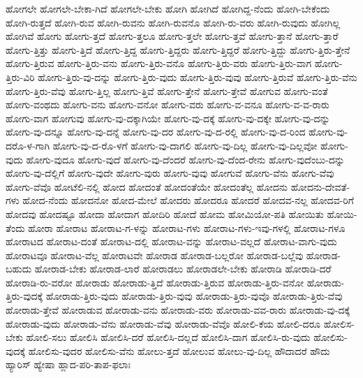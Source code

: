 {ಹೋಗಲೇ
ಹೋಗಲೇ-ಬೇಕಾ-ಗಿದೆ
ಹೋಗಲೇ-ಬೇಕು
ಹೋಗಿ
ಹೋಗಿದೆ
ಹೋಗಿದ್ದ-ನೆಂದು
ಹೋಗಿ-ಬೇಕೆಂದು
ಹೋಗಿ-ರುತ್ತದೆ
ಹೋಗಿ-ರುವ
ಹೋಗಿ-ರುವನು
ಹೋಗಿ-ರುವನೊ
ಹೋಗಿ-ರು-ವರು
ಹೋಗಿ-ರುವುದು
ಹೋಗಿಲ್ಲ
ಹೋಗಿವೆ
ಹೋಗು
ಹೋಗು-ತ್ತದೆ
ಹೋಗು-ತ್ತಲೂ
ಹೋಗು-ತ್ತಲೇ
ಹೋಗು-ತ್ತವೆ
ಹೋಗು-ತ್ತಾನೆ
ಹೋಗು-ತ್ತಾರೆ
ಹೋಗು-ತ್ತಿತ್ತು
ಹೋಗು-ತ್ತಿದೆ
ಹೋಗು-ತ್ತಿದ್ದ
ಹೋಗು-ತ್ತಿದ್ದರು
ಹೋಗು-ತ್ತಿದ್ದರೆ
ಹೋಗು-ತ್ತಿದ್ದು
ಹೋಗು-ತ್ತಿರು-ತ್ತೇನೆ
ಹೋಗು-ತ್ತಿರುವ
ಹೋಗು-ತ್ತಿರು-ವನು
ಹೋಗು-ತ್ತಿರು-ವನೊ
ಹೋಗು-ತ್ತಿರು-ವರು
ಹೋಗು-ತ್ತಿರು-ವಾಗ
ಹೋಗು-ತ್ತಿರು-ವಿರಿ
ಹೋಗು-ತ್ತಿರು-ವು-ದನ್ನು
ಹೋಗು-ತ್ತಿರು-ವುದು
ಹೋಗು-ತ್ತಿರು-ವುವು
ಹೋಗು-ತ್ತಿರುವೆ
ಹೋಗು-ತ್ತಿರು-ವೆನು
ಹೋಗು-ತ್ತಿರು-ವೆವು
ಹೋಗು-ತ್ತಿಲ್ಲ
ಹೋಗು-ತ್ತಿವೆ
ಹೋಗು-ತ್ತೇನೆ
ಹೋಗು-ತ್ತೇವೆ
ಹೋಗುವ
ಹೋಗು-ವಂತೆ
ಹೋಗು-ವಂಥದು
ಹೋಗು-ವನು
ಹೋಗು-ವನೋ
ಹೋಗು-ವರು
ಹೋಗು-ವ-ವನೂ
ಹೋಗು-ವ-ವ-ರಾರು
ಹೋಗು-ವಾಗ
ಹೋಗುವು
ಹೋಗು-ವು-ದಕ್ಕಾಗಿಯೇ
ಹೋಗು-ವು-ದಕ್ಕೆ
ಹೋಗು-ವು-ದಕ್ಕೇ
ಹೋಗು-ವು-ದನ್ನು
ಹೋಗು-ವು-ದನ್ನೂ
ಹೋಗು-ವು-ದನ್ನೆ
ಹೋಗು-ವು-ದರ
ಹೋಗು-ವು-ದ-ರಲ್ಲಿ
ಹೋಗು-ವು-ದ-ರಿಂದ
ಹೋಗು-ವು-ದರೊ-ಳ-ಗಾಗಿ
ಹೋಗು-ವು-ದ-ರೊ-ಳಗೆ
ಹೋಗು-ವು-ದಾಗಲಿ
ಹೋಗು-ವು-ದಿಲ್ಲ
ಹೋಗು-ವು-ದಿಲ್ಲವೋ
ಹೋಗು-ವುದು
ಹೋಗು-ವುದೂ
ಹೋಗು-ವುದೆ
ಹೋಗು-ವು-ದೆಂದರೆ
ಹೋಗು-ವು-ದೆಂದ-ರೇನು
ಹೋಗು-ವುದೆಂಬು-ದನ್ನು
ಹೋಗು-ವು-ದೆಲ್ಲಿಗೆ
ಹೋಗು-ವುದೇ
ಹೋಗು-ವುರು
ಹೋಗು-ವುವು
ಹೋಗುವೆ
ಹೋಗು-ವೆನು
ಹೋಗು-ವೆವು
ಹೋಗು-ವೆವೊ
ಹೋಟೆಲಿ-ನಲ್ಲಿ
ಹೋದ
ಹೋದಂತೆ
ಹೋದಂತೆಯೇ
ಹೋದಂತೆಲ್ಲ
ಹೋದನು
ಹೋದನು-ದೇವತೆ-ಗಳು
ಹೋದ-ನೆಂದು
ಹೋದನೋ
ಹೋದ-ಮೇಲೆ
ಹೋದರು
ಹೋದರೂ
ಹೋದರೆ
ಹೋದವ-ನಲ್ಲ
ಹೋದವ-ರಿಗೆ
ಹೋದವು
ಹೋದಷ್ಟೂ
ಹೋದಾ
ಹೋದಾಗ
ಹೋದಿರಿ
ಹೋದೆ
ಹೋಮ
ಹೋಮಿಯೋ-ಪತಿ
ಹೋಯಿತು
ಹೋಯಿ-ತೆಂದು
ಹೋರಾ
ಹೋರಾಟ
ಹೋರಾಟ-ಗ-ಳನ್ನು
ಹೋರಾಟ-ಗಳು
ಹೋರಾಟ-ಗಳು-ಇವು-ಗಳಲ್ಲಿ
ಹೋರಾಟ-ಗಳೂ
ಹೋರಾಟದ
ಹೋರಾಟ-ದಂತೆ
ಹೋರಾಟ-ದಲ್ಲಿ
ಹೋರಾಟ-ವನ್ನು
ಹೋರಾಟ-ವಲ್ಲದೆ
ಹೋರಾಟ-ವಾಗು-ವುದು
ಹೋರಾಟವೂ
ಹೋರಾಟ-ವೆಲ್ಲ
ಹೋರಾಟವೇ
ಹೋರಾಡ
ಹೋರಾಡ-ಬಲ್ಲರೋ
ಹೋರಾಡ-ಬಲ್ಲೆವು
ಹೋರಾಡ-ಬಹುದು
ಹೋರಾಡ-ಬೇಕು
ಹೋರಾಡ-ಲಾರೆ
ಹೋರಾಡಲು
ಹೋರಾಡಲೇ-ಬೇಕು
ಹೋರಾಡಿ
ಹೋರಾಡಿ-ದರೆ
ಹೋರಾಡಿ-ರು-ವರೋ
ಹೋರಾಡು
ಹೋರಾಡು-ತ್ತಿದೆ
ಹೋರಾಡು-ತ್ತಿರುವ
ಹೋರಾಡು-ತ್ತಿರು-ವನೋ
ಹೋರಾಡು-ತ್ತಿರು-ವುದಕ್ಕೆ
ಹೋರಾಡು-ತ್ತಿರು-ವುದು
ಹೋರಾಡು-ತ್ತಿರು-ವುವು
ಹೋರಾಡು-ತ್ತಿರು-ವುವೊ
ಹೋರಾಡು-ತ್ತಿರು-ವೆವು
ಹೋರಾಡು-ತ್ತೇವೆ
ಹೋರಾಡುವ
ಹೋರಾಡು-ವನು
ಹೋರಾಡು-ವರು
ಹೋರಾಡು-ವವ-ರಾರು
ಹೋರಾಡು-ವು-ದಕ್ಕೆ
ಹೋರಾಡು-ವುದು
ಹೋರಾಡು-ವೆನು
ಹೋರಾಡು-ವೆವು
ಹೋರಾಡು-ವೆವೊ
ಹೋಲಿ-ಕೆಯ
ಹೋಲಿ-ದರೂ
ಹೋಲಿಸ-ಬೇಕು
ಹೋಲಿ-ಸಲು
ಹೋಲಿಸಿ
ಹೋಲಿಸಿ-ದರೆ
ಹೋಲಿಸಿ-ದಲ್ಲದೆ
ಹೋಲಿಸಿ-ದಾಗ
ಹೋಲಿಸಿ-ರು-ವುದು
ಹೋಲಿಸು-ವುದಕ್ಕೆ
ಹೋಲಿಸು-ವುದರ
ಹೋಲಿಸು-ವೆನು
ಹೋಲು-ತ್ತದೆ
ಹೋಲುವ
ಹೋಲು-ವು-ದಿಲ್ಲ
ಹೌದಾದರೆ
ಹೌದು
ಹ್ಯಾರಿಸ್
ಹ್ಯೇಷಾ
ಹ್ಲಾದ-ಪರಿ-ತಾಪ-ಫಲಾಃ
}
